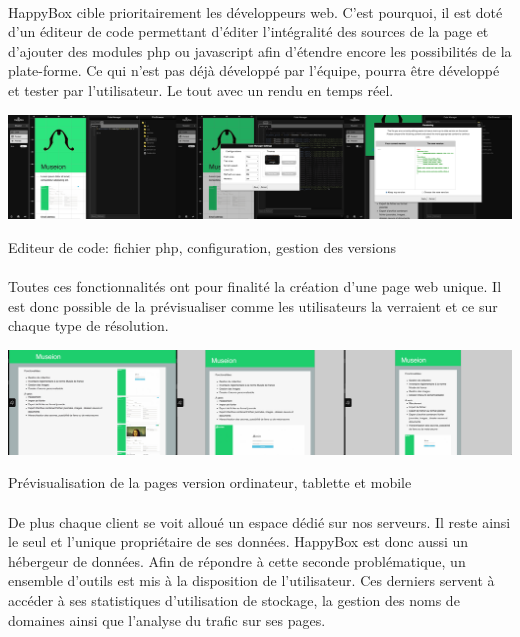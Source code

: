 \documentclass[11pt, a4paper ]{article}
\begin{document}
\begin{spacing}{1.5}
\paragraph{} %
HappyBox cible prioritairement les développeurs web. C'est pourquoi, il est doté d'un éditeur de code permettant d'éditer l'intégralité des sources de la page et d'ajouter des modules php ou javascript afin d'étendre encore les possibilités de la plate-forme. Ce qui n'est pas déjà développé par l'équipe, pourra être développé et tester par l'utilisateur. Le tout avec un rendu en temps réel.
\begin{center}
	\includegraphics[width=\textwidth]{images/HBscreen/codeManager.png}
	\caption{Editeur de code: fichier php, configuration, gestion des versions}
\end{center}

\paragraph{}

Toutes ces fonctionnalités ont pour finalité la création d'une page web unique. Il est donc possible de la prévisualiser comme les utilisateurs la verraient et ce sur chaque type de résolution.
\begin{center}
	\includegraphics[width=\textwidth]{images/HBscreen/preview.png}
	\caption{Prévisualisation de la pages version ordinateur, tablette et mobile}
\end{center}

\paragraph{}
De plus chaque client se voit alloué un espace dédié sur nos serveurs. Il reste ainsi le seul et l'unique propriétaire de ses données. HappyBox est donc aussi un hébergeur de données. Afin de répondre à cette seconde problématique, un ensemble d'outils est mis à la disposition de l'utilisateur. Ces derniers servent à accéder à ses statistiques d'utilisation de stockage, la gestion des noms de domaines ainsi que l'analyse du trafic sur ses pages.


\end{spacing}
\end{document}

